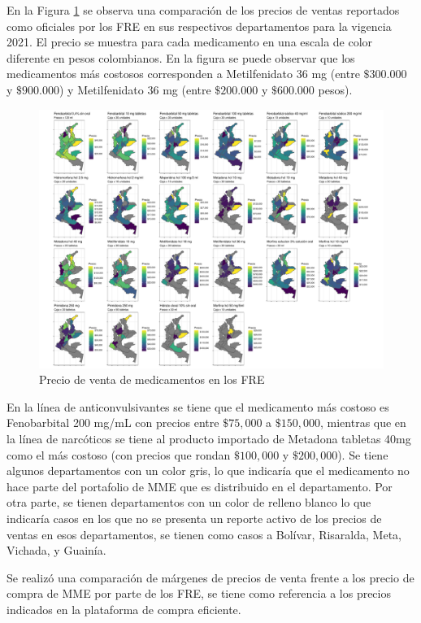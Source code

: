 \documentclass[
]{book}
\begin{document}
En la Figura \ref{fig:precioVentasDepartamentos} se observa una comparación de los precios de ventas reportados como oficiales por los FRE en sus respectivos departamentos para la vigencia 2021. El precio se muestra para cada medicamento en una escala de color diferente en pesos colombianos. En la figura se puede observar que los medicamentos más costosos corresponden a Metilfenidato 36 mg (entre \(\$300.000\) y \(\$900.000\)) y Metilfenidato 36 mg (entre \(\$200.000\) y \(\$600.000\) pesos).

\begin{figure}[t!]
\includegraphics[width=1\linewidth]{InformeFinal_files/figure-latex/precioVentasDepartamentos-1} \caption{Precio de venta de medicamentos en los FRE}\label{fig:precioVentasDepartamentos}
\end{figure}

En la línea de anticonvulsivantes se tiene que el medicamento más costoso es Fenobarbital 200 mg/mL con precios entre \(\$75,000\) a \(\$150,000\), mientras que en la línea de narcóticos se tiene al producto importado de Metadona tabletas 40mg como el más costoso (con precios que rondan \(\$100,000\) y \(\$200,000\)). Se tiene algunos departamentos con un color gris, lo que indicaría que el medicamento no hace parte del portafolio de MME que es distribuido en el departamento. Por otra parte, se tienen departamentos con un color de relleno blanco lo que indicaría casos en los que no se presenta un reporte activo de los precios de ventas en esos departamentos, se tienen como casos a Bolívar, Risaralda, Meta, Vichada, y Guainía.

Se realizó una comparación de márgenes de precios de venta frente a los precio de compra de MME por parte de los FRE, se tiene como referencia a los precios indicados en la plataforma de compra eficiente.
\end{document}
